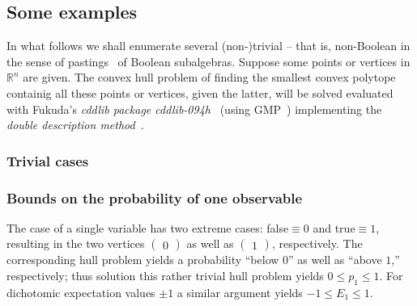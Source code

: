 \subsection{Some examples}
\label{2017-b-se}

In what follows we shall enumerate several (non-)trivial -- that is, non-Boolean in the sense of pastings~\cite{greechie:71,kalmbach-83,nav:91,pulmannova-91}
of Boolean subalgebras. Suppose some points or vertices in $\mathbb{R}^n$ are given.
The convex hull problem
of finding the smallest convex polytope containig all these points or vertices, given the latter,
will be solved evaluated with Fukuda's {\em cddlib package cddlib-094h}~\cite{cdd-pck} (using GMP~\cite{gmplib})
implementing the {\em double description method}~\cite{FP96,Avis:1997:GCH:280651.280652,Avis-2002}.


\subsubsection{Trivial cases}
\label{2017-b-trivc}



\subsubsection*{Bounds on the probability of one observable}

The case of a single variable has two extreme cases: false$\equiv 0$ and true$\equiv 1$,
resulting in the two vertices $\begin{pmatrix} 0\end{pmatrix}$
as well as $\begin{pmatrix} 1\end{pmatrix}$, respectively. The corresponding hull problem yields a probability ``below $0$'' as well as ``above $1$,''
respectively; thus solution this rather trivial hull problem yields
$0\le p_1 \le 1$.  For dichotomic expectation values $\pm 1$   a similar argument yields   $-1\le E_1 \le 1$.

